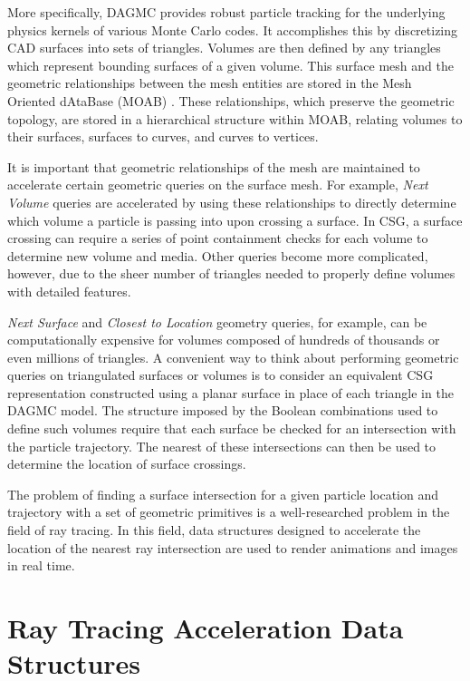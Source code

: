 More specifically, DAGMC provides robust particle tracking for the underlying
physics kernels of various Monte Carlo codes. It accomplishes this by
discretizing CAD surfaces into sets of triangles. Volumes are then defined by
any triangles which represent bounding surfaces of a given volume. This surface
mesh and the geometric relationships between the mesh entities are stored in the
Mesh Oriented dAtaBase (MOAB) \cite{Tautges_2004}. These relationships, which
preserve the geometric topology, are stored in a hierarchical structure within
MOAB, relating volumes to their surfaces, surfaces to curves, and curves to
vertices.

It is important that geometric relationships of the mesh are maintained to
accelerate certain geometric queries on the surface mesh. For example,
\textit{Next Volume} queries are accelerated by using these relationships to
directly determine which volume a particle is passing into upon crossing a
surface. In CSG, a surface crossing can require a series of point containment
checks for each volume to determine new volume and media. Other queries become
more complicated, however, due to the sheer number of triangles needed to
properly define volumes with detailed features.

\textit{Next Surface} and \textit{Closest to Location} geometry queries, for
example, can be computationally expensive for volumes composed of hundreds of
thousands or even millions of triangles. A convenient way to think about
performing geometric queries on triangulated surfaces or volumes is to consider
an equivalent CSG representation constructed using a planar surface in place of
each triangle in the DAGMC model. The structure imposed by the Boolean
combinations used to define such volumes require that each surface be checked
for an intersection with the particle trajectory. The nearest of these
intersections can then be used to determine the location of surface crossings.

The problem of finding a surface intersection for a given particle location and
trajectory with a set of geometric primitives is a well-researched problem in
the field of ray tracing. In this field, data structures designed to accelerate
the location of the nearest ray intersection are used to render animations and
images in real time.

\section{Ray Tracing Acceleration Data Structures}

